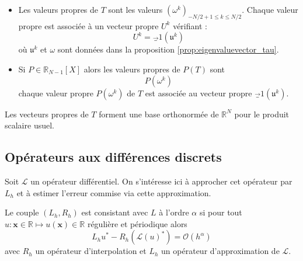 \begin{corollaire}
\begin{itemize}
\item Les valeurs propres de $T$ sont les valeurs $(\omega^k)_{-N/2+1 \leq k \leq N/2}$. 
Chaque valeur propre est associée à un vecteur propre $U^k$ vérifiant :
\begin{equation}
U^k = \vec_1 (\mathfrak{u}^k )
\label{eq:eigenvectorT}
\end{equation}
où $\mathfrak{u}^k$ et $\omega$ sont données dans la proposition \ref{prop:eigenvaluevector_tau}.

\item Si $P \in \mathbb{R}_{N-1}[X]$ alors les valeurs propres de $P(T)$ sont 
\begin{equation}
P(\omega^k)
\end{equation}
chaque valeur propre $P(\omega^k)$ de $T$ est associée au vecteur propre $\vec_1 (\mathfrak{u}^k )$.
\end{itemize}
\label{prop:eigen_P(T)}
\end{corollaire}

Les vecteurs propres de $T$ forment une base orthonormée de $\mathbb{R}^N$ pour le produit scalaire usuel.



















\subsection{Opérateurs aux différences discrets}

Soit $\mathcal{L}$ un opérateur différentiel. On s'intéresse ici à approcher cet opérateur par $L_h$ et à estimer l'erreur commise via cette approximation.

\begin{definition}
Le couple $(L_h, R_h)$ est consistant avec $L$ à l'ordre $\alpha$ si pour tout $u : \mathbf{x} \in \mathbb{R} \mapsto u(\mathbf{x}) \in \mathbb{R}$ régulière et périodique alors 
\begin{equation}
L_h u^* - R_h (\mathcal{L}(u)^*) = \mathcal{O} \left ( h^{\alpha} \right)
\end{equation}
avec $R_h$ un opérateur d'interpolation et $L_h$ un opérateur d'approximation de $\mathcal{L}$.
\end{definition}





